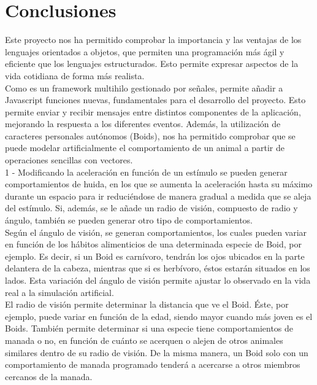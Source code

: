 \section{Conclusiones}
\label{chap:conclusiones}

Este proyecto nos ha permitido comprobar la importancia y las ventajas de los lenguajes orientados a objetos, que permiten una programación más 
ágil y eficiente que los lenguajes estructurados. Esto permite expresar aspectos de la vida cotidiana de forma más realista.\\

Como \lluvia{} es un framework multihilo gestionado por señales, permite añadir a Javascript funciones nuevas, fundamentales para el desarrollo 
del proyecto. Esto permite enviar y recibir mensajes entre distintos componentes de la aplicación, mejorando la respuesta a los diferentes 
eventos. Además, la utilización de caracteres personales autónomos (Boids), nos ha permitido comprobar que se puede modelar artificialmente el 
comportamiento de un animal a partir de operaciones sencillas con vectores.\\

1 - Modificando la aceleración en función de un estímulo se pueden generar comportamientos de huida, en los que se aumenta la aceleración hasta 
su máximo durante un espacio para ir reduciéndose de manera gradual a medida que se aleja del estímulo.
Si, además, se le añade un radio de visión, compuesto de radio y ángulo, también se pueden generar otro tipo de comportamientos.\\

Según el ángulo de visión, se generan comportamientos, los cuales pueden variar en función de los hábitos alimenticios de 
una determinada especie de Boid, por ejemplo. Es decir, si un Boid es carnívoro, tendrán los ojos ubicados en la parte delantera de la cabeza,
mientras que si es herbívoro, éstos estarán situados en los lados. Esta variación del ángulo de visión permite ajustar lo observado en la vida 
real a la simulación artificial.\\

El radio de visión permite determinar la distancia que ve el Boid. Éste, por ejemplo, puede variar en función de la edad, siendo mayor cuando
más joven es el Boids. También permite determinar si una especie tiene comportamientos de manada o no, en función de cuánto se acerquen o 
alejen de otros animales similares dentro de su radio de visión. De la misma manera, un Boid solo con un comportamiento de manada programado 
tenderá a acercarse a otros miembros cercanos de la manada.\\

